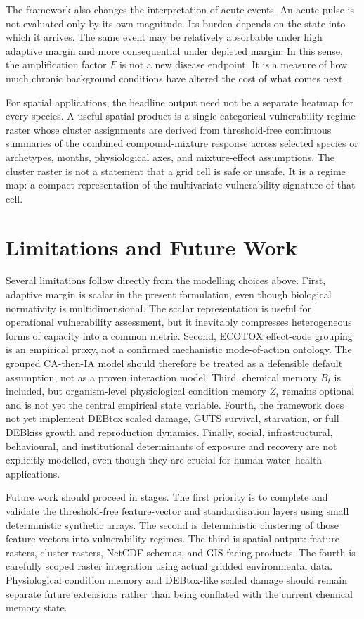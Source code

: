 The framework also changes the interpretation of acute events. An acute pulse is not evaluated only by its own magnitude. Its burden depends on the state into which it arrives. The same event may be relatively absorbable under high adaptive margin and more consequential under depleted margin. In this sense, the amplification factor $F$ is not a new disease endpoint. It is a measure of how much chronic background conditions have altered the cost of what comes next.

For spatial applications, the headline output need not be a separate heatmap for every species. A useful spatial product is a single categorical vulnerability-regime raster whose cluster assignments are derived from threshold-free continuous summaries of the combined compound-mixture response across selected species or archetypes, months, physiological axes, and mixture-effect assumptions. The cluster raster is not a statement that a grid cell is safe or unsafe. It is a regime map: a compact representation of the multivariate vulnerability signature of that cell.

\section{Limitations and Future Work}
\label{sec:limitations}

Several limitations follow directly from the modelling choices above. First, adaptive margin is scalar in the present formulation, even though biological normativity is multidimensional. The scalar representation is useful for operational vulnerability assessment, but it inevitably compresses heterogeneous forms of capacity into a common metric. Second, ECOTOX effect-code grouping is an empirical proxy, not a confirmed mechanistic mode-of-action ontology. The grouped CA-then-IA model should therefore be treated as a defensible default assumption, not as a proven interaction model. Third, chemical memory $B_t$ is included, but organism-level physiological condition memory $Z_t$ remains optional and is not yet the central empirical state variable. Fourth, the framework does not yet implement DEBtox scaled damage, GUTS survival, starvation, or full DEBkiss growth and reproduction dynamics. Finally, social, infrastructural, behavioural, and institutional determinants of exposure and recovery are not explicitly modelled, even though they are crucial for human water--health applications.

Future work should proceed in stages. The first priority is to complete and validate the threshold-free feature-vector and standardisation layers using small deterministic synthetic arrays. The second is deterministic clustering of those feature vectors into vulnerability regimes. The third is spatial output: feature rasters, cluster rasters, NetCDF schemas, and GIS-facing products. The fourth is carefully scoped raster integration using actual gridded environmental data. Physiological condition memory and DEBtox-like scaled damage should remain separate future extensions rather than being conflated with the current chemical memory state.

